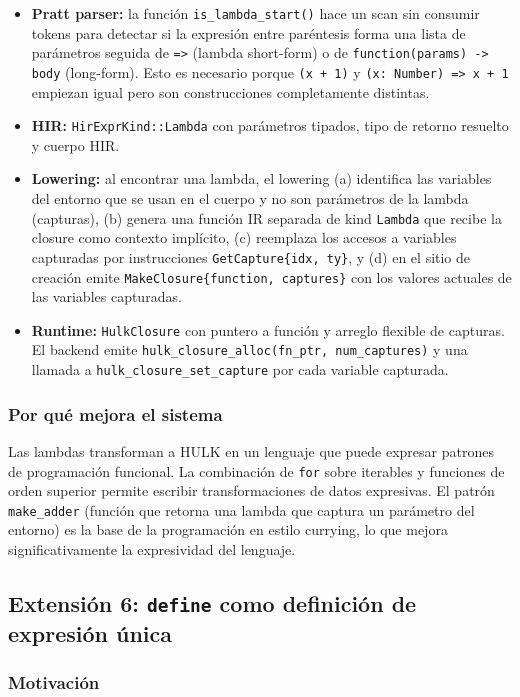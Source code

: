 \documentclass[12pt,letterpaper]{article}
\newcommand{\hulk}{\textsc{HULK}}
\newcommand{\src}[1]{\texttt{#1}}
\begin{document}
\begin{itemize}
    \item \textbf{Pratt parser:} la función \src{is\_lambda\_start()} hace un scan sin consumir tokens para detectar si la expresión entre paréntesis forma una lista de parámetros seguida de \src{=>} (lambda short-form) o de \src{function(params) -> body} (long-form). Esto es necesario porque \src{(x + 1)} y \src{(x: Number) => x + 1} empiezan igual pero son construcciones completamente distintas.
    \item \textbf{HIR:} \src{HirExprKind::Lambda} con parámetros tipados, tipo de retorno resuelto y cuerpo HIR.
    \item \textbf{Lowering:} al encontrar una lambda, el lowering (a) identifica las variables del entorno que se usan en el cuerpo y no son parámetros de la lambda (capturas), (b) genera una función IR separada de kind \src{Lambda} que recibe la closure como contexto implícito, (c) reemplaza los accesos a variables capturadas por instrucciones \src{GetCapture\{idx, ty\}}, y (d) en el sitio de creación emite \src{MakeClosure\{function, captures\}} con los valores actuales de las variables capturadas.
    \item \textbf{Runtime:} \src{HulkClosure} con puntero a función y arreglo flexible de capturas. El backend emite \src{hulk\_closure\_alloc(fn\_ptr, num\_captures)} y una llamada a \src{hulk\_closure\_set\_capture} por cada variable capturada.
\end{itemize}

\subsubsection{Por qué mejora el sistema}

Las lambdas transforman a \hulk{} en un lenguaje que puede expresar patrones de programación funcional. La combinación de \src{for} sobre iterables y funciones de orden superior permite escribir transformaciones de datos expresivas. El patrón \src{make\_adder} (función que retorna una lambda que captura un parámetro del entorno) es la base de la programación en estilo currying, lo que mejora significativamente la expresividad del lenguaje.

\subsection{Extensión 6: \src{define} como definición de expresión única}

\subsubsection{Motivación}
\end{document}
